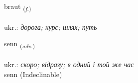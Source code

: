 \documentclass[frontgrid, backgrid]{flacards}\usepackage[]{graphicx}\usepackage[]{xcolor}
\begin{document}
\renewcommand{\blhead}{\vskip5pt {\small\bfseries\footnotesize Nafnorð | іменник }}
\renewcommand{\bcfoot}{\vskip5pt \hspace{2pt}{\small\bfseries\footnotesize 2K}}


{braut \small{\textsubscript{(\textit{f.})}} \\[1ex] %
\textphonetic{[prœiːt]} \\
ukr.: \emph{дорога; курс; шлях; путь} \\  [2ex]
\renewcommand*{\arraystretch}{0.8}
}


\renewcommand{\flhead}{\vskip5pt \fboxsep=0pt {\small\bfseries\footnotesize Atviksorð | прислівник}}
\renewcommand{\fcfoot}{\vskip5pt \fboxsep=0pt \hspace{2pt}{\small\bfseries\footnotesize 2K}}

\renewcommand{\blhead}{\vskip5pt {\small\bfseries\footnotesize Atviksorð | прислівник }}
\renewcommand{\bcfoot}{\vskip5pt \hspace{2pt}{\small\bfseries\footnotesize 2K}}


{senn \small{\textsubscript{(\textit{adv.})}} \\[1ex]
\textphonetic{[sɛn]} \\
ukr.: \emph{скоро; відразу; в одний і той же час} \\  [2ex]
senn (Indeclinable)}

\renewcommand{\flhead}{\vskip5pt \fboxsep=0pt {\small\bfseries\footnotesize Nafnorð | іменник}}
\renewcommand{\fcfoot}{\vskip5pt \fboxsep=0pt \hspace{2pt}{\small\bfseries\footnotesize 2K}}

\renewcommand{\blhead}{\vskip5pt {\small\bfseries\footnotesize Nafnorð | іменник }}
\renewcommand{\bcfoot}{\vskip5pt \hspace{2pt}{\small\bfseries\footnotesize 2K}}
\end{document}
